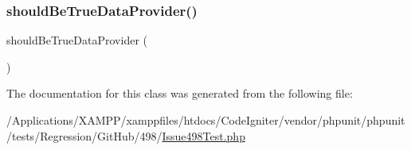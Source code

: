 \subsubsection{\texorpdfstring{should\+Be\+True\+Data\+Provider()}{shouldBeTrueDataProvider()}}
{\footnotesize\ttfamily should\+Be\+True\+Data\+Provider (\begin{DoxyParamCaption}{ }\end{DoxyParamCaption})}



The documentation for this class was generated from the following file\+:\begin{DoxyCompactItemize}
\item 
/\+Applications/\+X\+A\+M\+P\+P/xamppfiles/htdocs/\+Code\+Igniter/vendor/phpunit/phpunit/tests/\+Regression/\+Git\+Hub/498/\mbox{\hyperlink{_issue498_test_8php}{Issue498\+Test.\+php}}\end{DoxyCompactItemize}

